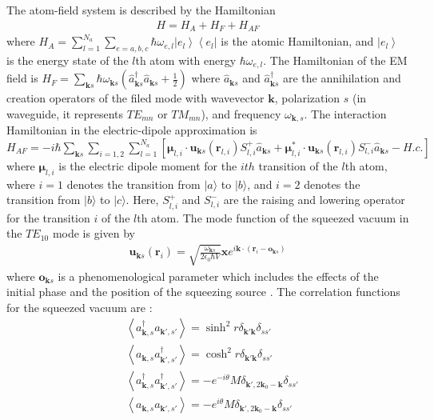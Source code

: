 \documentclass[aps,showpacs,twocolumn,twoside,groupedaddress]{revtex4}
\let\vec\bm
\begin{document}
The atom-field system is described by the Hamiltonian \begin{equation}
  \label{hamltonian}
  \begin{gathered}
H=H_{A}+H_{F}+H_{AF}
 \end{gathered}
\end{equation}
where
$H_{A}=\sum_{l=1}^{N_a}\sum_{e=a,b,c}\hbar\omega_{e,l}\left|e_{l}\right\rangle \left\langle e_{l}\right|$  
is the atomic Hamiltonian, and $ \left|e_{l}\right\rangle $ is the energy state of the $l$th atom with energy $\hbar\omega_{e,l}$. The Hamiltonian of the EM field is
$H_{F}=\sum_{\vec{k}s}\hbar\omega_{\vec{k}s}(\hat{a}_{\vec{k}s}^{\dagger}\hat{a}_{\vec{k}s}+\frac{1}{2})$
where $\hat{a}_{\vec{k}s}$ and $\hat{a}_{\vec{k}s}^{\dagger}$ are the annihilation and creation operators of the filed mode with wavevector $ \vec{k}$, polarization $s$ (in waveguide, it represents $TE_{mn}$ or $TM_{mn}$), and frequency $\omega_{\vec{k},s}$. The interaction Hamiltonian in the electric-dipole approximation is
$H_{AF}=-i\hbar\sum_{\vec{k}s}\sum_{i=1,2}\sum_{l=1}^{N_{a}}[\vec{\mu}_{l,i}\cdot\vec{u}_{\vec{k}s}(\vec{r}_{l,i})S_{l,i}^{+}\hat{a}_{\vec{k}s}+\vec{\mu}_{l,i}^{*}\cdot\vec{u}_{\vec{k}s}(\vec{r}_{l,i})S_{l,i}^{-}\hat{a}_{\vec{k}s}-H.c.]$
where $ \vec{\mu}_{l,i} $ is the electric dipole moment for the $ith$ transition of the $l$th atom, where $i=1$ denotes the transition from $|a\rangle$ to $|b\rangle$, and $i=2$ denotes the transition from $|b\rangle$ to $|c\rangle$. Here, $ S_{l,i}^{+} $ and $S_{l,i}^{-} $ are the raising and lowering operator for the transition $i$ of the $l$th atom. The mode function of the squeezed vacuum in the $TE_{10}$ mode is given by
\begin{equation}
  \label{eq2b}
  \begin{gathered}
\vec{u}_{\vec{k}s}(\vec{r}_{i})=\sqrt{\frac{\omega_{\vec{k}s}}{2\epsilon_{0}\hbar V}}\vec{x}e^{i\vec{k}\cdot(\vec{r}_{i}-\vec{o}_{\vec{k}s})}
 \end{gathered}
\end{equation}
where $\vec{o}_{\vec{k}s} $ is a phenomenological parameter which includes the effects of the initial phase and the position of the squeezing source \cite{You2018}. The correlation functions for the squeezed vacuum are \cite{scully1999quantum}:
\begin{equation}
\label{eq0a}
\begin{split}
& \left\langle a_{\vec{k},s}^{\dagger}a_{\vec{k}',s'}\right\rangle =\sinh^{2}r\delta_{\vec{k}'\vec{k}}\delta_{ss'} \\
& \left\langle a_{\vec{k},s}a_{\vec{k}',s'}^{\dagger}\right\rangle =\cosh^{2}r\delta_{\vec{k}'\vec{k}}\delta_{ss'}\\
& \left\langle a_{\vec{k},s}^{\dagger}a_{\vec{k}',s'}^{\dagger}\right\rangle =-e^{-i\theta}M\delta_{\vec{k}',2\vec{k}_{0}-\vec{k}}\delta_{ss'}\\
&\left\langle a_{\vec{k},s}a_{\vec{k}',s'}\right\rangle =-e^{i\theta}M\delta_{\vec{k}',2\vec{k}_{0}-\vec{k}}\delta_{ss'}
\end{split}
\end{equation}
\end{document}
